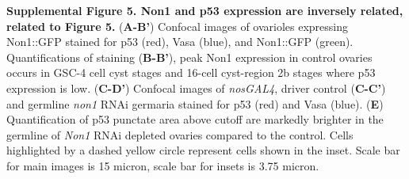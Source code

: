 \documentclass[12pt,twoside]{reedthesis}
\begin{document}
\textbf{Supplemental Figure 5. Non1 and p53 expression are inversely related,
related to Figure 5.} (\textbf{A-B'}) Confocal images of ovarioles
expressing Non1::GFP stained for p53 (red), Vasa (blue), and Non1::GFP
(green). Quantifications of staining (\textbf{B-B'}), peak Non1 expression in
control ovaries occurs in GSC-4 cell cyst stages and 16-cell cyst-region
2b stages where p53 expression is low. (\textbf{C-D'}) Confocal images of
\emph{nosGAL4}, driver control (\textbf{C-C'}) and germline \emph{non1} RNAi germaria
stained for p53 (red) and Vasa (blue). (\textbf{E}) Quantification of p53
punctate area above cutoff are markedly brighter in the germline of
\emph{Non1} RNAi depleted ovaries compared to the control. Cells highlighted
by a dashed yellow circle represent cells shown in the inset. Scale bar
for main images is 15 micron, scale bar for insets is 3.75 micron.
\end{document}
